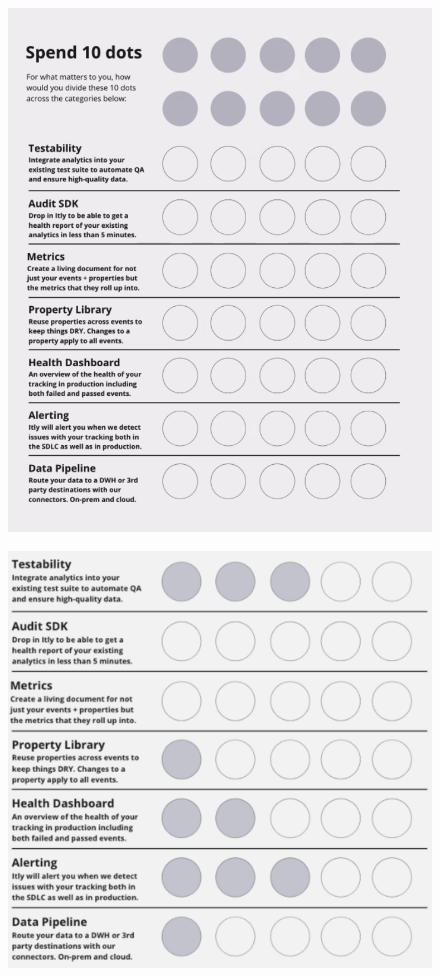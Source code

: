 \begin{figure}[htbp!]
\centering
\begin{minipage}{.45\textwidth}
  \centering
  \includegraphics[width=\textwidth]{images/iteratively/spend-10-dots.png}
  \label{fig:iteratively-spend-ten-dots}
\end{minipage}\hfill%
\begin{minipage}{.45\textwidth}
  \centering
  \includegraphics[width=\textwidth]{images/iteratively/dot-voting-example.png}

\end{minipage}
\end{figure}
